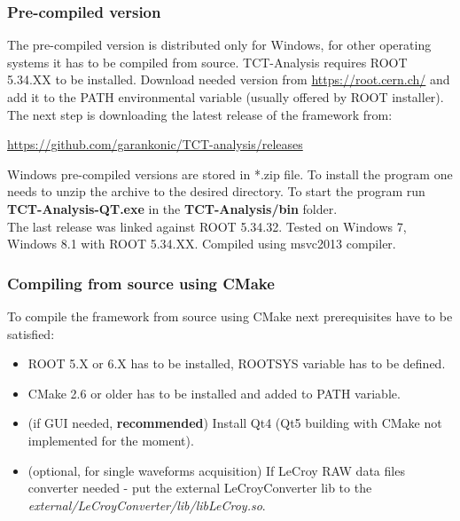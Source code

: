 \documentclass[12pt,oneside,notitlepage,abstracton,a4paper]{scrartcl}
\begin{document}
\subsubsection{Pre-compiled version}

The pre-compiled version is distributed only for Windows, for other operating systems it has to be compiled from source. TCT-Analysis requires ROOT 5.34.XX to be installed. Download needed version from \url{https://root.cern.ch/} and add it to the PATH environmental variable (usually offered by ROOT installer).
\\ \indent The next step is downloading the latest release of the framework from:
\begin{displayquote}
\url{https://github.com/garankonic/TCT-analysis/releases}
\end{displayquote}
Windows pre-compiled versions are stored in *.zip file. To install the program one needs to unzip the archive to the desired directory.
To start the program run \textbf{TCT-Analysis-QT.exe} in the \textbf{TCT-Analysis/bin} folder.
\\ \indent The last release was linked against ROOT 5.34.32. Tested on Windows 7, Windows 8.1 with ROOT 5.34.XX. Compiled using msvc2013 compiler.

\subsubsection{Compiling from source using CMake}

To compile the framework from source using CMake next prerequisites have to be satisfied:
\begin{itemize}
\item ROOT 5.X or 6.X has to be installed, ROOTSYS variable has to be defined.
\item CMake 2.6 or older has to be installed and added to PATH variable.
\item (if GUI needed, \textbf{recommended}) Install Qt4 (Qt5 building with CMake not implemented for the moment).
\item (optional, for single waveforms acquisition) If LeCroy RAW data files converter needed - put the external LeCroyConverter lib to the \textit{external/LeCroyConverter/lib/libLeCroy.so}.
\end{itemize}
\end{document}
